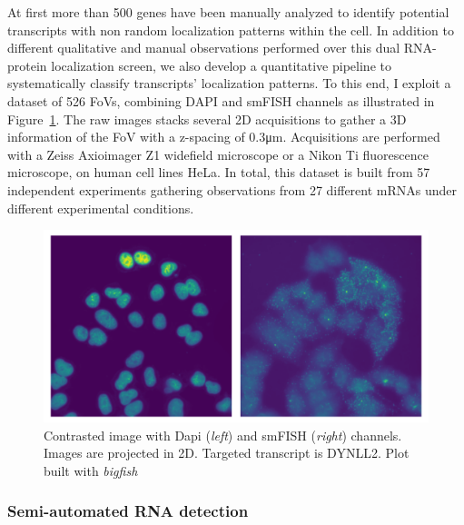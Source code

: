 At first more than 500 genes have been manually analyzed to identify potential transcripts with non random localization patterns within the cell.
In addition to different qualitative and manual observations performed over this dual \ac{RNA}-protein localization screen, we also develop a quantitative pipeline to systematically classify transcripts' localization patterns.
To this end, I exploit a dataset of 526 \ac{FoV}s, combining DAPI and \ac{smFISH} channels as illustrated in Figure~\ref{fig:fov_racha}.
The raw images stacks several 2D acquisitions to gather a 3D information of the \ac{FoV} with a z-spacing of 0.3μm.
Acquisitions are performed with a Zeiss Axioimager Z1 widefield microscope or a Nikon Ti fluorescence microscope, on human cell lines HeLa.
In total, this dataset is built from 57 independent experiments gathering observations from 27 different \ac{mRNA}s under different experimental conditions.

\begin{figure}[]
    \centering
    \includegraphics[width=\textwidth]{figures/chapter5/FoV_DYNLL2}
    \caption[Contrasted image with Dapi and smFISH channels]{Contrasted image with Dapi (\textit{left}) and smFISH (\textit{right}) channels.
	Images are projected in 2D.
	Targeted transcript is DYNLL2.
	Plot built with \emph{bigfish}}
    \label{fig:fov_racha}
\end{figure}

\subsubsection{Semi-automated RNA detection}

